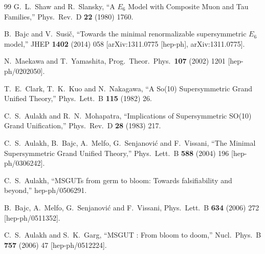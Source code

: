 \documentclass[a4paper,12pt]{article}
\begin{document}
\begin{thebibliography}{99}
G.~L.~Shaw and R.~Slansky,
``A $E_{6}$ Model with Composite Muon and Tau Families,''
Phys.\ Rev.\ D {\bf 22} (1980) 1760.


  B.~Bajc and V.~Susi\v{c},
  ``Towards the minimal renormalizable supersymmetric $E_6$ model,''
  JHEP {\bf 1402} (2014) 058
  [arXiv:1311.0775 [hep-ph], arXiv:1311.0775].

  N.~Maekawa and T.~Yamashita,
  Prog.\ Theor.\ Phys.\  {\bf 107} (2002) 1201
  [hep-ph/0202050].

T.~E.~Clark, T.~K.~Kuo and N.~Nakagawa,
``A So(10) Supersymmetric Grand Unified Theory,''
Phys.\ Lett.\ B {\bf 115} (1982) 26.


C.~S.~Aulakh and R.~N.~Mohapatra,
``Implications of Supersymmetric SO(10) Grand Unification,''
Phys.\ Rev.\ D {\bf 28} (1983) 217.


C.~S.~Aulakh, B.~Bajc, A.~Melfo, G.~Senjanovi\'c and F.~Vissani,
``The Minimal Supersymmetric Grand Unified Theory,''
Phys.\ Lett.\ B {\bf 588} (2004) 196
[hep-ph/0306242].

  C.~S.~Aulakh,
  ``MSGUTs from germ to bloom: Towards falsifiability and beyond,''
  hep-ph/0506291.

  B.~Bajc, A.~Melfo, G.~Senjanovi\'c and F.~Vissani,
  Phys.\ Lett.\ B {\bf 634} (2006) 272
  [hep-ph/0511352].

  C.~S.~Aulakh and S.~K.~Garg,
  ``MSGUT : From bloom to doom,''
  Nucl.\ Phys.\ B {\bf 757} (2006) 47
  [hep-ph/0512224].


\end{thebibliography}
\end{document}
